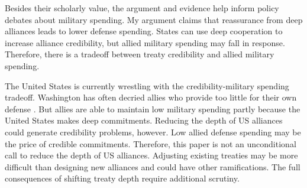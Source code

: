 \documentclass[12pt]{article}
\begin{document}
Besides their scholarly value, the argument and evidence help inform policy debates about military spending. 
My argument claims that reassurance from deep alliances leads to lower defense spending. 
States can use deep cooperation to increase alliance credibility, but allied military spending may fall in response. 
Therefore, there is a tradeoff between treaty credibility and allied military spending. 


The United States is currently wrestling with the credibility-military spending tradeoff. 
Washington has often decried allies who provide too little for their own defense \citep{Lanoszka2015}. 
But allies are able to maintain low military spending partly because the United States makes deep commitments. 
Reducing the depth of US alliances could generate credibility problems, however. 
Low allied defense spending may be the price of credible commitments.  
Therefore, this paper is not an unconditional call to reduce the depth of US alliances. 
Adjusting existing treaties may be more difficult than designing new alliances and could have other ramifications. 
The full consequences of shifting treaty depth require additional scrutiny. 

 



\singlespace
 
 
\end{document}
